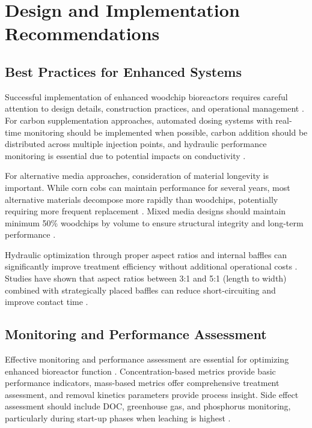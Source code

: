 \documentclass[12pt,a4paper]{article}
\begin{document}
\section{Design and Implementation Recommendations}

\subsection{Best Practices for Enhanced Systems}

Successful implementation of enhanced woodchip bioreactors requires careful attention to design details, construction practices, and operational management \citep{RN310, RN312}. For carbon supplementation approaches, automated dosing systems with real-time monitoring should be implemented when possible, carbon addition should be distributed across multiple injection points, and hydraulic performance monitoring is essential due to potential impacts on conductivity \citep{RN632}.

For alternative media approaches, consideration of material longevity is important. While corn cobs can maintain performance for several years, most alternative materials decompose more rapidly than woodchips, potentially requiring more frequent replacement \citep{RN350, RN624}. Mixed media designs should maintain minimum 50\% woodchips by volume to ensure structural integrity and long-term performance \citep{RN350}.

Hydraulic optimization through proper aspect ratios and internal baffles can significantly improve treatment efficiency without additional operational costs \citep{RN309}. Studies have shown that aspect ratios between 3:1 and 5:1 (length to width) combined with strategically placed baffles can reduce short-circuiting and improve contact time \citep{RN309}.

\subsection{Monitoring and Performance Assessment}

Effective monitoring and performance assessment are essential for optimizing enhanced bioreactor function \citep{RN310, RN312}. Concentration-based metrics provide basic performance indicators, mass-based metrics offer comprehensive treatment assessment, and removal kinetics parameters provide process insight. Side effect assessment should include DOC, greenhouse gas, and phosphorus monitoring, particularly during start-up phases when leaching is highest \citep{RN291, RN1181}.
\end{document}
